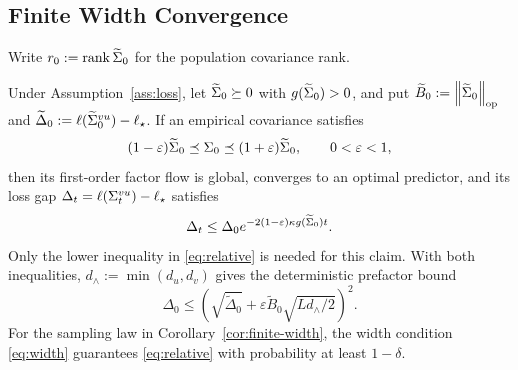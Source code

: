\subsection{Finite Width Convergence}\label{app:sampling}
Write $r_0:=\operatorname{rank}\widetilde\Sigma_0$ for the population covariance rank.
\begin{theorem}\label{thm:relative}
Under Assumption~\ref{ass:loss}, let $\widetilde\Sigma_0\succeq0$ with
$g(\widetilde\Sigma_0)>0$, and put $\widetilde B_0:=\left\lVert \widetilde\Sigma_0 \right\rVert_{\mathrm{op}}$ and
$\widetilde\Delta_0:=\ell({\widetilde{\Sigma}}^{vu}_0)-\ell_\star$.
If an empirical covariance satisfies
\begin{equation}\label{eq:relative}
 (1-\varepsilon)\widetilde\Sigma_0\preceq\Sigma_0
 \preceq(1+\varepsilon)\widetilde\Sigma_0,\qquad 0<\varepsilon<1,
\end{equation}
then its first-order factor flow is global, converges to an optimal
predictor, and its loss gap $\Delta_t=\ell(\Sigma^{vu}_t)-\ell_\star$ satisfies
\begin{equation}\label{eq:sample-rate}
 \Delta_t\le\Delta_0
 e^{-2(1-\varepsilon)\kappa g(\widetilde\Sigma_0)t}.
\end{equation}
Only the lower inequality in \eqref{eq:relative} is needed for this claim.
With both inequalities, $d_\wedge:=\min(d_u,d_v)$ gives the deterministic
prefactor bound
\begin{equation}\label{eq:sample-prefactor}
 \Delta_0\le
 \left(\sqrt{\widetilde\Delta_0}+\varepsilon \widetilde B_0\sqrt{Ld_\wedge/2}\right)^2.
\end{equation}
For the sampling law in Corollary~\ref{cor:finite-width}, the width
condition \eqref{eq:width} guarantees \eqref{eq:relative} with probability
at least $1-\delta$.
\end{theorem}


